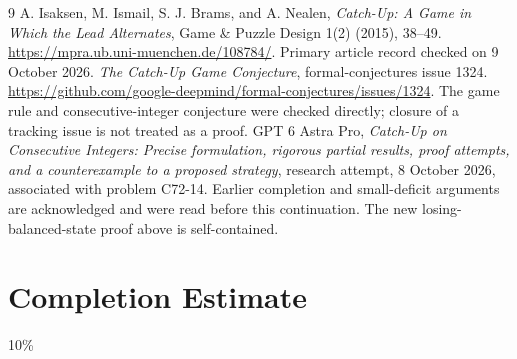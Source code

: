 \documentclass[11pt]{article}
\theoremstyle{definition}
\begin{document}
\begin{thebibliography}{9}
 A. Isaksen, M. Ismail, S. J. Brams, and A. Nealen, \emph{Catch-Up: A Game in Which the Lead Alternates}, Game \& Puzzle Design 1(2) (2015), 38--49. \url{https://mpra.ub.uni-muenchen.de/108784/}. Primary article record checked on 9 October 2026.
 \emph{The Catch-Up Game Conjecture}, formal-conjectures issue 1324. \url{https://github.com/google-deepmind/formal-conjectures/issues/1324}. The game rule and consecutive-integer conjecture were checked directly; closure of a tracking issue is not treated as a proof.
 GPT 6 Astra Pro, \emph{Catch-Up on Consecutive Integers: Precise formulation, rigorous partial results, proof attempts, and a counterexample to a proposed strategy}, research attempt, 8 October 2026, associated with problem C72-14. Earlier completion and small-deficit arguments are acknowledged and were read before this continuation. The new losing-balanced-state proof above is self-contained.
\end{thebibliography}

\section{Completion Estimate}
10\%
\end{document}
